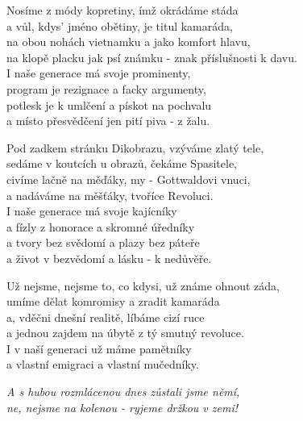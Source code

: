 
\ve{}
Nosíme z módy kopretiny, ímž okrádáme stáda\\
a vůl, kdys' jméno obětiny, je titul kamaráda,\\
na obou nohách vietnamku a jako komfort hlavu,\\
na klopě placku jak psí známku - znak příslušnosti k davu.\\
I naše generace má svoje prominenty,\\
program je rezignace a facky argumenty,\\
potlesk je k umlčení a pískot na pochvalu\\
a místo přesvědčení jen pití piva - z žalu.

\ve{}
Pod zadkem stránku Dikobrazu, vzýváme zlatý tele,\\
sedáme v koutcích u obrazů, čekáme Spasitele,\\
civíme lačně na měďáky, my - Gottwaldovi vnuci,\\
a nadáváme na měšťáky, tvoříce Revoluci.\\
I naše generace má svoje kajícníky\\
a fízly z honorace a skromné úředníky\\
a tvory bez svědomí a plazy bez páteře\\
a život v bezvědomí a lásku - k nedůvěře.

\ve{}
Už nejsme, nejsme to, co kdysi, už známe ohnout záda,\\
umíme dělat komromisy a zradit kamaráda\\
a, vděčni dnešní realitě, líbáme cizí ruce\\
a jednou zajdem na úbytě z tý smutný revoluce.\\
I v naší generaci už máme pamětníky\\
a vlastní emigraci a vlastní mučedníky.

\textit{A s hubou rozmlácenou dnes zůstali jsme němí,\\
ne, nejsme na kolenou - ryjeme držkou v zemi!}

\esong